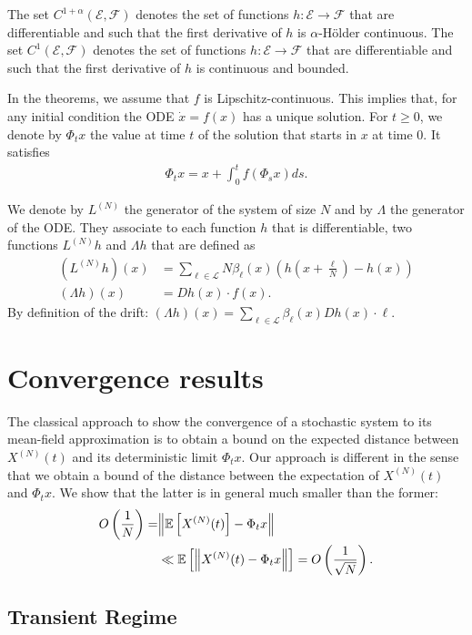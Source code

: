 \documentclass[sigconf]{acmart}
\newcommand\XN{X^{(N)}}
\newcommand\LN{L^{(N)}}
\newcommand\E{\mathcal{E}}
\newcommand\calL{\mathcal{L}}
\newcommand\calF{\mathcal{F}}
\newcommand\esp[1]{{\mathchoice{\besp{#1}}{\sesp{#1}}{\sesp{#1}}{\sesp{#1}}}}
\newcommand\besp[1]{\mathbb{E}\left[#1\right]}
\newcommand\sesp[1]{\mathbb{E}[#1]}
\newcommand\norm[1]{{\mathchoice{\bnorm{#1}}{\snorm{#1}}{\snorm{#1}}{\snorm{#1}}}}
\newcommand\bnorm[1]{\left\|#1\right\|}
\newcommand\snorm[1]{\|#1\|}
\newcommand\p[1]{\left(#1\right)}
\begin{document}
The set $C^{1+\alpha}(\E,\calF)$ denotes the set of functions
$h:\E\to\calF$ that are differentiable and such that the first
derivative of $h$ is $\alpha$-Hölder continuous.  The set
$C^1(\E,\calF)$ denotes the set of functions $h:\E\to\calF$ that are
differentiable and such that the first derivative of $h$ is
continuous and bounded.

In the theorems, we assume that $f$ is Lipschitz-continuous. This
implies that, for any initial condition the ODE $\dot{x}=f(x)$ has a
unique solution. For $t\ge0$, we denote by $\Phi_tx$ the value at time
$t$ of the solution that starts in $x$ at time $0$. It satisfies
\begin{align*}
  \Phi_tx = x + \int_0^t f(\Phi_sx)ds. 
\end{align*}

We denote by $\LN$ the generator of the system of size $N$ and by
$\Lambda$ the generator of the ODE. They associate to each function
$h$ that is differentiable, two functions $\LN h$ and $\Lambda h$ that
are defined as 
\begin{align*}
  (\LN h) (x) &= \sum_{\ell\in\calL} N\beta_\ell(x) ( h(x+\frac{\ell}{N})-h(x) )\\
  (\Lambda h) (x) &= D h(x) \cdot f(x).
\end{align*}
By definition of the drift:
$(\Lambda h)(x)=\sum_{\ell\in\calL} \beta_\ell(x) D h(x) \cdot \ell$.


\section{Convergence results}
\label{sec:convergence}

The classical approach to show the convergence of a stochastic system
to its mean-field approximation is to obtain a bound on the expected
distance between $\XN(t)$ and its deterministic limit $\Phi_tx$.
Our approach is different in the sense that we obtain a bound of the
distance between the expectation of $\XN(t)$ and $\Phi_tx$. We show
that the latter is in general much smaller than the former:
\begin{align*}
  O\p{\frac1N} =& \norm{\esp{\XN(t)} - \Phi_t x}\\
               &\ll \esp{\norm{\XN(t) - \Phi_t x}} =
                 O\p{\frac1{\sqrt{N}}}. 
\end{align*}


\subsection{Transient Regime}
\label{sec:transient}
\end{document}
